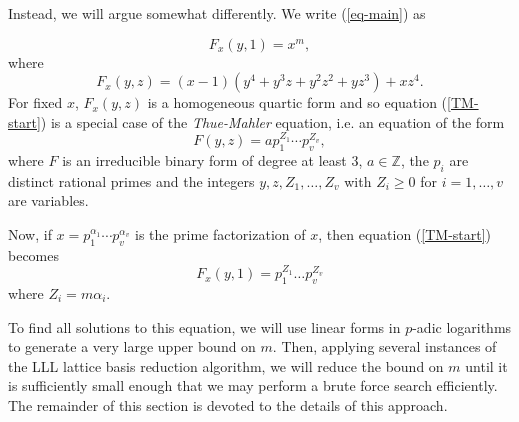{%
 
 
 Instead, we will argue somewhat differently. We write (\ref{eq-main}) as
 
 \begin{equation} \label{TM-start}
 F_x(y,1) = x^m,
 \end{equation}
 where
 $$
 F_x(y,z) = (x-1)(y^4 + y^3z + y^2z^2 + yz^3) + xz^4.
 $$
 For fixed $x$, $F_x(y,z)$ is a homogeneous quartic form and so equation (\ref{TM-start}) is a special case of the \textit{Thue-Mahler} equation, i.e. an equation of the form
 \begin{equation} \label{TM-normal}
 F(y,z) = a p_1^{Z_1}\cdots p_v^{Z_v},
 \end{equation}
 where $F$ is an irreducible binary form of degree at least $3$, $a \in \mathbb{Z}$, the $p_i$ are distinct rational primes and the 
 integers $y, z, Z_1, \dots, Z_v$ with $Z_i \geq 0$ for $i = 1, \dots, v$ are variables. 

Now, if $x = p_1^{\alpha_1}\cdots p_v^{\alpha_v}$ is the prime factorization of $x$, then equation (\ref{TM-start}) becomes 
\begin{equation}\label{Eq:main}
F_x(y,1) =  p_1^{Z_1}\dots p_v^{Z_v}
\end{equation}
where $Z_i = m\alpha_i$. 

To find all solutions to this equation, we will use linear forms in $p$-adic logarithms to generate a very large upper bound on $m$. Then, applying several instances of the LLL lattice basis reduction algorithm, we will reduce the bound on $m$ until it is sufficiently small enough that we may perform a brute force search efficiently. The remainder of this section is devoted to the details of this approach.

}
